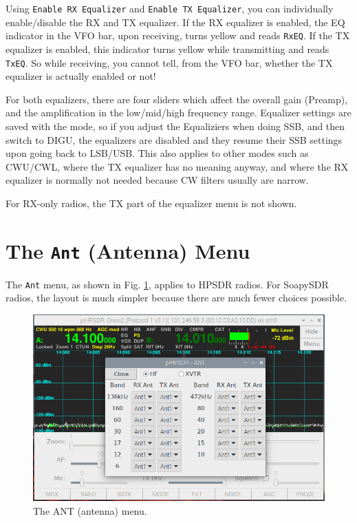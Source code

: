\documentclass[12pt]{book}
\def\rett#1{\texttt{\color{red}#1}}
\def\bltt#1{\texttt{\color{blue}#1}}
\begin{document}
Using \rett{Enable RX Equalizer} and \rett{Enable TX Equalizer},
you can individually enable/disable the RX and TX equalizer.
If the RX equalizer is enabled, the EQ indicator in the
VFO bar, upon receiving, turns yellow and reads \rett{RxEQ}.
If the TX equalizer is enabled, this indicator turns yellow
while transmitting and reads \rett{TxEQ}. So while receiving,
you cannot tell, from the VFO bar, whether the TX equalizer is
actually enabled or not!

For both equalizers, there are four sliders which affect the
overall gain (Preamp), and the amplification in the low/mid/high
frequency range. Equalizer settings are saved with the mode, so
if you adjust the Equaliziers when doing SSB, and then switch to
DIGU, the equalizers are disabled and they resume their SSB
settings upon going back to LSB/USB. This also applies to other
modes such as CWU/CWL, where the TX equalizer has no meaning
anyway, and where the RX equalizer is normally not needed because
CW filters usually are narrow.

For RX-only radios, the TX part of the equalizer menu is not shown.

\section{The \texttt{Ant} (Antenna) Menu}

The \bltt{Ant} menu, as shown in Fig. \ref{fig:ANTmenu},
applies to HPSDR radios. For SoapySDR radios, the layout
is much simpler because there are much fewer choices possible.

\begin{figure}[ht]
\center
\includegraphics[width=12cm]{ANTmenu.png}
\caption{The ANT (antenna) menu.}
\label{fig:ANTmenu}
\end{figure}
\end{document}
